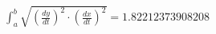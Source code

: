 \documentclass[preview]{standalone}
\begin{document}
\begin{align*}
\int_{a}^{b} \sqrt{\left(\frac{dy}{dt}\right)^2 \cdot \left(\frac{dx}{dt}\right)^2} = 1.82212373908208
\end{align*}
\end{document}

